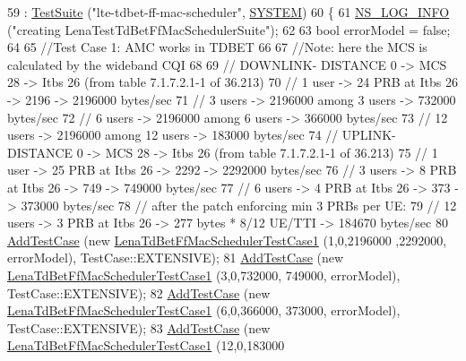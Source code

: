 \begin{DoxyCode}
59   : \hyperlink{classns3_1_1TestSuite_a904b0c40583b744d30908aeb94636d1a}{TestSuite} (\textcolor{stringliteral}{"lte-tdbet-ff-mac-scheduler"}, \hyperlink{classns3_1_1TestSuite_a1ebfcab34ec8161e085e8e3a1855eae0a90c5529a26ab3a5ffcc6e57040dbd82e}{SYSTEM})
60 \{
61   \hyperlink{group__logging_gafbd73ee2cf9f26b319f49086d8e860fb}{NS\_LOG\_INFO} (\textcolor{stringliteral}{"creating LenaTestTdBetFfMacSchedulerSuite"});
62 
63   \textcolor{keywordtype}{bool} errorModel = \textcolor{keyword}{false};
64 
65   \textcolor{comment}{//Test Case 1: AMC works in TDBET}
66 
67   \textcolor{comment}{//Note: here the MCS is calculated by the wideband CQI}
68 
69   \textcolor{comment}{// DOWNLINK- DISTANCE 0 -> MCS 28 -> Itbs 26 (from table 7.1.7.2.1-1 of 36.213)}
70   \textcolor{comment}{// 1 user -> 24 PRB at Itbs 26 -> 2196 -> 2196000 bytes/sec}
71   \textcolor{comment}{// 3 users -> 2196000 among 3 users -> 732000  bytes/sec}
72   \textcolor{comment}{// 6 users -> 2196000 among 6 users -> 366000  bytes/sec}
73   \textcolor{comment}{// 12 users -> 2196000 among 12 users -> 183000  bytes/sec}
74   \textcolor{comment}{// UPLINK- DISTANCE 0 -> MCS 28 -> Itbs 26 (from table 7.1.7.2.1-1 of 36.213)}
75   \textcolor{comment}{// 1 user -> 25 PRB at Itbs 26 -> 2292 -> 2292000 bytes/sec}
76   \textcolor{comment}{// 3 users -> 8 PRB at Itbs 26 -> 749 -> 749000 bytes/sec}
77   \textcolor{comment}{// 6 users -> 4 PRB at Itbs 26 -> 373 -> 373000 bytes/sec}
78   \textcolor{comment}{// after the patch enforcing min 3 PRBs per UE:}
79   \textcolor{comment}{// 12 users -> 3 PRB at Itbs 26 -> 277 bytes * 8/12 UE/TTI -> 184670 bytes/sec}
80   \hyperlink{classns3_1_1TestCase_a3718088e3eefd5d6454569d2e0ddd835}{AddTestCase} (\textcolor{keyword}{new} \hyperlink{classLenaTdBetFfMacSchedulerTestCase1}{LenaTdBetFfMacSchedulerTestCase1} (1,0,2196000
      ,2292000, errorModel), TestCase::EXTENSIVE);
81   \hyperlink{classns3_1_1TestCase_a3718088e3eefd5d6454569d2e0ddd835}{AddTestCase} (\textcolor{keyword}{new} \hyperlink{classLenaTdBetFfMacSchedulerTestCase1}{LenaTdBetFfMacSchedulerTestCase1} (3,0,732000,
      749000, errorModel), TestCase::EXTENSIVE);
82   \hyperlink{classns3_1_1TestCase_a3718088e3eefd5d6454569d2e0ddd835}{AddTestCase} (\textcolor{keyword}{new} \hyperlink{classLenaTdBetFfMacSchedulerTestCase1}{LenaTdBetFfMacSchedulerTestCase1} (6,0,366000,
      373000, errorModel), TestCase::EXTENSIVE);
83   \hyperlink{classns3_1_1TestCase_a3718088e3eefd5d6454569d2e0ddd835}{AddTestCase} (\textcolor{keyword}{new} \hyperlink{classLenaTdBetFfMacSchedulerTestCase1}{LenaTdBetFfMacSchedulerTestCase1} (12,0,183000

\end{DoxyCode}
